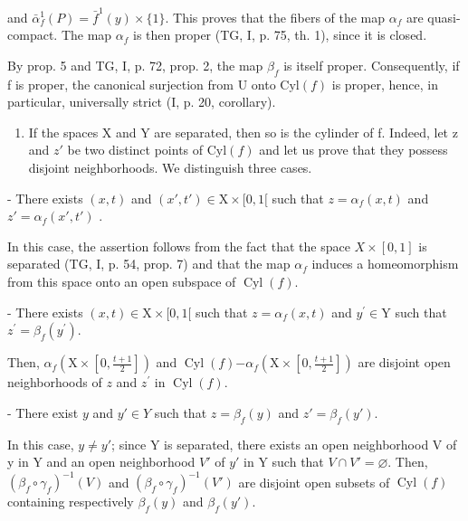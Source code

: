 and \(\bar{\alpha}_{f}^{1}(P) = \bar{f}^{1}(y) \times \{1\}\). This proves that the fibers of the map \(\alpha_{f}\) are quasi-compact. The map \(\alpha_{f}\) is then proper (TG, I, p. 75, th. 1), since it is closed.

By prop. 5 and TG, I, p. 72, prop. 2, the map \(\beta_f\) is itself proper. Consequently, if f is proper, the canonical surjection from U onto \(\mathrm{Cyl}(f)\) is proper, hence, in particular, universally strict (I, p. 20, corollary).

\begin{enumerate}
\def\labelenumi{\arabic{enumi})}
\setcounter{enumi}{2}
\tightlist
\item
  If the spaces X and Y are separated, then so is the cylinder of f. Indeed, let z and \(z'\) be two distinct points of \(\mathrm{Cyl}(f)\) and let us prove that they possess disjoint neighborhoods. We distinguish three cases.
\end{enumerate}

- There exists \((x,t)\) and \((x',t') \in \mathrm{X} \times [0,1[\) such that \(z = \alpha_f(x,t)\) and \(z' = \alpha_f(x',t')\) .

In this case, the assertion follows from the fact that the space \(X \times [0,1]\) is separated (TG, I, p. 54, prop. 7) and that the map \(\alpha_{f}\) induces a homeomorphism from this space onto an open subspace of \(\operatorname{Cyl}(f)\).

- There exists \((x,t)\in \mathrm{X}\times [0,1[\) such that \(z = \alpha_{f}(x,t)\) and \(y^{\prime}\in \mathrm{Y}\) such that \(z^{\prime} = \beta_{f}(y^{\prime})\).

Then, \(\alpha_{f}(\mathrm{X}\times [0,\frac{t + 1}{2}])\) and \(\operatorname {Cyl}(f)\mathbf{-}\alpha_{f}(\mathrm{X}\times [0,\frac{t + 1}{2}])\) are disjoint open neighborhoods of \(z\) and \(z^{\prime}\) in \(\operatorname {Cyl}(f)\).

- There exist \(y\) and \(y'\in Y\) such that \(z=\beta_f(y)\) and \(z'=\beta_f(y')\).

In this case, \(y\neq y'\); since Y is separated, there exists an open neighborhood V of y in Y and an open neighborhood \(V'\) of \(y'\) in Y such that \(V\cap V'=\varnothing\). Then, \((\beta_f\circ\gamma_f)^{-1}(V)\) and \((\beta_f\circ\gamma_f)^{-1}(V')\) are disjoint open subsets of \(\operatorname{Cyl}(f)\) containing respectively \(\beta_f(y)\) and \(\beta_f(y')\).


